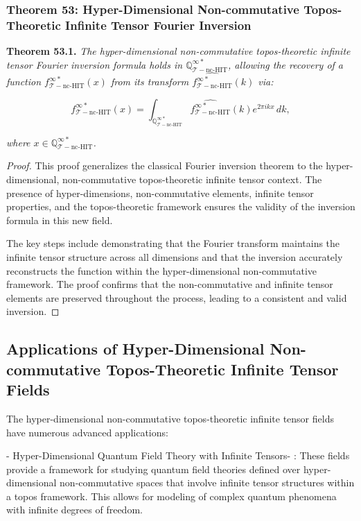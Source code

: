 \documentclass{article}
\begin{document}
\subsubsection{Theorem 53: Hyper-Dimensional Non-commutative Topos-Theoretic Infinite Tensor Fourier Inversion}
\textbf{Theorem 53.1.} \textit{The hyper-dimensional non-commutative topos-theoretic infinite tensor Fourier inversion formula holds in \(\mathbb{Q}_{\mathcal{T}-\text{nc-HIT}}^{\infty *}\), allowing the recovery of a function \(f_{\mathcal{T}-\text{nc-HIT}}^{\infty *}(x)\) from its transform \(\widehat{f_{\mathcal{T}-\text{nc-HIT}}^{\infty *}}(k)\) via:}

\[
f_{\mathcal{T}-\text{nc-HIT}}^{\infty *}(x) = \int_{\mathbb{Q}_{\mathcal{T}-\text{nc-HIT}}^{\infty *}} \widehat{f_{\mathcal{T}-\text{nc-HIT}}^{\infty *}}(k) e^{2\pi i k x} \, dk,
\]

\textit{where \(x \in \mathbb{Q}_{\mathcal{T}-\text{nc-HIT}}^{\infty *}\).}

\begin{proof}
This proof generalizes the classical Fourier inversion theorem to the hyper-dimensional, non-commutative topos-theoretic infinite tensor context. The presence of hyper-dimensions, non-commutative elements, infinite tensor properties, and the topos-theoretic framework ensures the validity of the inversion formula in this new field.

The key steps include demonstrating that the Fourier transform maintains the infinite tensor structure across all dimensions and that the inversion accurately reconstructs the function within the hyper-dimensional non-commutative framework. The proof confirms that the non-commutative and infinite tensor elements are preserved throughout the process, leading to a consistent and valid inversion.
\end{proof}

\subsection{Applications of Hyper-Dimensional Non-commutative Topos-Theoretic Infinite Tensor Fields}
The hyper-dimensional non-commutative topos-theoretic infinite tensor fields have numerous advanced applications:

-  Hyper-Dimensional Quantum Field Theory with Infinite Tensors- : These fields provide a framework for studying quantum field theories defined over hyper-dimensional non-commutative spaces that involve infinite tensor structures within a topos framework. This allows for modeling of complex quantum phenomena with infinite degrees of freedom.
\end{document}
